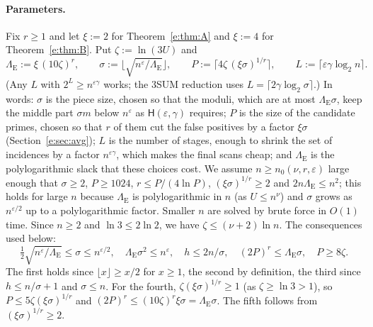 \documentclass[11pt]{article}
\theoremstyle{definition}
\theoremstyle{remark}
\newcommand{\Hyp}{\mathsf{H}}
\begin{document}
\paragraph{Parameters.} Fix $r\ge1$ and let $\xi:=2$ for Theorem~\ref{e:thm:A} and $\xi:=4$ for Theorem~\ref{e:thm:B}. Put $\zeta:=\ln(3U)$ and
\[
\Lambda_{\mathrm E}:=\xi\,(10\zeta)^r,\qquad
\sigma:=\big\lfloor\sqrt{n^\varepsilon/\Lambda_{\mathrm E}}\big\rfloor,\qquad
P:=\big\lceil4\zeta\,(\xi\sigma)^{1/r}\big\rceil,\qquad
L:=\lceil\varepsilon\gamma\log_2n\rceil .
\]
(Any $L$ with $2^L\ge n^{\varepsilon\gamma}$ works; the 3SUM reduction uses $L=\lceil2\gamma\log_2\sigma\rceil$.)
In words: $\sigma$ is the piece size, chosen so that the moduli, which are at most $\Lambda_{\mathrm E}\sigma$, keep the middle part $\sigma m$ below $n^\varepsilon$ as $\Hyp(\varepsilon,\gamma)$ requires; $P$ is the size of the candidate primes, chosen so that $r$ of them cut the false positives by a factor $\xi\sigma$ (Section~\ref{e:sec:avg}); $L$ is the number of stages, enough to shrink the set of incidences by a factor $n^{\varepsilon\gamma}$, which makes the final scans cheap; and $\Lambda_{\mathrm E}$ is the polylogarithmic slack that these choices cost.
We assume $n\ge n_0(\nu,r,\varepsilon)$ large enough that $\sigma\ge2$, $P\ge1024$, $r\le P/(4\ln P)$, $(\xi\sigma)^{1/r}\ge2$ and $2n\Lambda_{\mathrm E}\le n^2$; this holds for large $n$ because $\Lambda_{\mathrm E}$ is polylogarithmic in $n$ (as $U\le n^\nu$) and $\sigma$ grows as $n^{\varepsilon/2}$ up to a polylogarithmic factor. Smaller $n$ are solved by brute force in $O(1)$ time. Since $n\ge2$ and $\ln3\le2\ln2$, we have $\zeta\le(\nu+2)\ln n$. The consequences used below:
\begin{equation}\label{e:eq:params}
\tfrac12\sqrt{n^\varepsilon/\Lambda_{\mathrm E}}\le\sigma\le n^{\varepsilon/2},\quad \Lambda_{\mathrm E}\sigma^2\le n^\varepsilon,\quad h\le2n/\sigma,\quad (2P)^r\le\Lambda_{\mathrm E}\sigma,\quad P\ge8\zeta .
\end{equation}
The first holds since $\lfloor x\rfloor\ge x/2$ for $x\ge1$, the second by definition, the third since $h\le n/\sigma+1$ and $\sigma\le n$. For the fourth, $\zeta(\xi\sigma)^{1/r}\ge1$ (as $\zeta\ge\ln3>1$), so $P\le5\zeta(\xi\sigma)^{1/r}$ and $(2P)^r\le(10\zeta)^r\xi\sigma=\Lambda_{\mathrm E}\sigma$. The fifth follows from $(\xi\sigma)^{1/r}\ge2$.
\end{document}
